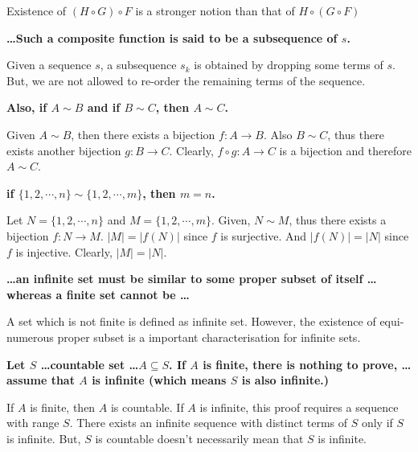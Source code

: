 \documentclass[a4paper,12pt,openany]{book}
\begin{document}
\begin{challenge}
	Existence of $(H \circ G) \circ F$ is a stronger notion than that of $H \circ ( G \circ F)$
\end{challenge}

\textbf{\phantom{}}
\textbf{\dots Such a composite function is said to be a subsequence of $s$.}\\
\begin{story}
	Given a sequence $s$, a subsequence $s_k$ is obtained by dropping some terms of $s$.
	But, we are not allowed to re-order the remaining terms of the sequence.
\end{story}

\textbf{\phantom{}}
\textbf{Also, if $A \sim B$ and if $B \sim C$, then $A \sim C$.}\\
\begin{story}
	Given $A \sim B$, then there exists a bijection $f : A \to B$.
	Also $B \sim C$, thus there exists another bijection $g : B \to C$.
	Clearly, $f \circ g : A \to C$ is a bijection and therefore $A \sim C$.
\end{story}

\textbf{\phantom{}}
\textbf{if $\{1,2,\cdots,n\} \sim \{1,2,\cdots,m\}$, then $m = n$.}\\
\begin{story}
	Let $N = \{ 1,2,\cdots,n \}$ and $M = \{ 1,2,\cdots,m \}$.
	Given, $N \sim M$, thus there exists a bijection $f : N \to M$.
	$|M| = |f(N)|$ since $f$ is surjective.
	And $|f(N)| = |N|$ since $f$ is injective.
	Clearly, $|M| = |N|$.
\end{story}

\textbf{\phantom{}}
\textbf{\dots an infinite set must be similar to some proper subset of itself \dots whereas a finite set cannot be \dots }\\
\begin{story}
	A set which is not finite is defined as infinite set.
	However, the existence of equi-numerous proper subset is a important characterisation for infinite sets.
\end{story}

\textbf{\phantom{}}
\textbf{Let $S$ \dots countable set \dots $A \subseteq S$. If $A$ is finite, there is nothing to prove, \dots assume that $A$ is infinite (which means $S$ is also infinite.)}\\
\begin{story}
	If $A$ is finite, then $A$ is countable.
	If $A$ is infinite, this proof requires a sequence with range $S$.
	There exists an infinite sequence with distinct terms of $S$ only if $S$ is infinite.
	But, $S$ is countable doesn't necessarily mean that $S$ is infinite.
\end{story}
\end{document}
